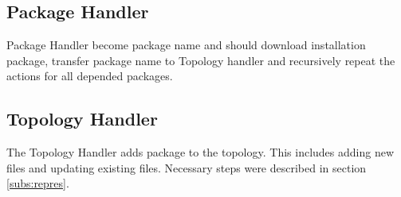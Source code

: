 \subsection{Package Handler} \label{subs:archph}
Package Handler become package name and should download installation package, transfer package name to Topology handler and recursively repeat the actions for all depended packages.

\subsection{Topology Handler} \label{subs:archtop}
The Topology Handler adds package to the topology. 
This includes adding new files and updating existing files. 
Necessary steps were described in section \ref{subs:repres}.
